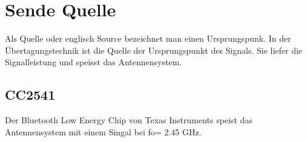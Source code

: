 \section{Sende Quelle}
Als Quelle oder englisch Source bezeichnet man einen Ursprungspunk. In der Übertagungstechnik ist die Quelle der Ursprungspunkt des Signals. Sie liefer die Signalleistung und speisst das Antennensystem.
\subsection{CC2541}
Der Bluetooth Low Energy Chip von Texas Instruments speist das Antennensystem mit einem Singal bei fo= 2.45 GHz.